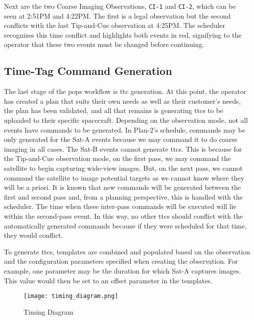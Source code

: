 Next are the two Coarse Imaging Observations, \texttt{CI-1} and \texttt{CI-2},
which can be seen at 2:51PM and 4:22PM\@. The first is a legal observation but
the second conflicts with the last Tip-and-Cue observation at 4:25PM\@. The
scheduler recognizes this time conflict and highlights both events in red,
signifying to the operator that these two events must be changed before
continuing.

\subsection{Time-Tag Command Generation}\label{sec:ttc-gen}

The last stage of the \gls{pops} workflow is \gls{ttc} generation.  At this
point, the operator has created a plan that suits their own needs as well as
their customer’s needs, the plan has been validated, and all that remains is
generating \glspl{ttc} to be uploaded to their specific spacecraft.  Depending
on the observation mode, not all events have commands to be generated. In
Plan-2's schedule, commands may be only generated for the Sat-A events because
we may command it to do coarse imaging in all cases. The Sat-B events cannot
generate \glspl{ttc}. This is because for the Tip-and-Cue observation mode, on
the first pass, we may command the satellite to begin capturing wide-view
images.  But, on the next pass, we cannot command the satellite to image
potential targets as we cannot know where they will be a priori. It is known
that new commands will be generated between the first and second pass and, from
a planning perspective, this is handled with the scheduler. The time when these
inter-pass commands will be executed will lie within the second-pass event. In
this way, no other \glspl{ttc} should conflict with the automatically generated
commands because if they were scheduled for that time, they would conflict. 

To generate \glspl{ttc}, templates are combined and populated based on the
observation and the configuration parameters specified when creating the
observation. For example, one parameter may be the duration for which Sat-A
captures images. This value would then be set to an offset parameter in the
templates. 

\begin{figure}[h] 
    \centering
    \texttt{[image: timing\_diagram.png]} 
    \caption{Timing Diagram}
    \label{fig:timing-diagram} 
\end{figure}

